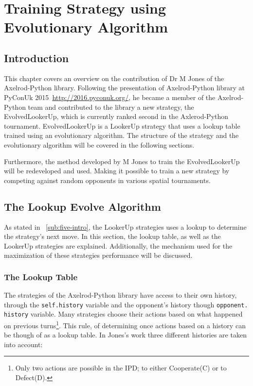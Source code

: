 \chapter{Training Strategy using Evolutionary Algorithm}
\label{chap:Five}
\section{Introduction}
\label{sub:five-intro}
This chapter covers an overview on the contribution of Dr M Jones
of the Axelrod-Python library. Following the presentation of Axelrod-Python
library at PyConUk 2015~\url{http://2016.pyconuk.org/}, he became a member of
the Axelrod-Python team and contributed to the library a new strategy, the
EvolvedLookerUp, which is currently ranked second in the Axlerod-Python tournament.
EvolvedLookerUp is a LookerUp strategy that uses a lookup table trained using an
evolutionary algorithm. The structure of the strategy and the evolutionary algorithm
will be covered in the following sections.

Furthermore, the method developed by M Jones to train the EvolvedLookerUp
will be redeveloped and used. Making it possible to train a new strategy
by competing against random opponents in various spatial tournaments.


\section{The Lookup Evolve Algorithm}
\label{sub:lookup-evolve-algorithm}
As stated in ~\autoref{sub:five-intro}, the LookerUp strategies uses a lookup to
determine the strategy's next move. In this section, the lookup table, as well as
the LookerUp strategies are explained. Additionally, the mechanism used for the
maximization of these strategies performance will be discussed.

\subsection{The Lookup Table}
\label{sub:lookup-tables}
The strategies of the Axelrod-Python library have access to their own history,
through the \texttt{self.history} variable and the opponent's history though
\texttt{opponent.}
\texttt{history} variable. Many strategies choose their actions based
on what happened on previous turns\footnote{Only two actions are possible in the
IPD; to either Cooperate(C) or to Defect(D).}. This rule, of determining once actions
based on a history can be though of as a lookup table.
In Jones's work three different histories are taken into account:

